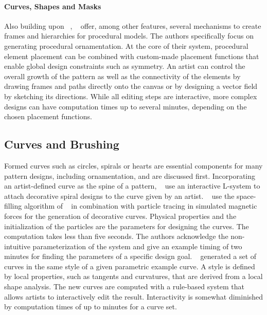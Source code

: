 {\paragraph*{Curves, Shapes and Masks} Also building upon \citeauthor*{wong_1998_cgf}~\cite{wong_1998_cgf}, \citeauthor*{gieseke_2017_ooo}~\cite{gieseke_2017_ooo} offer, among other features, several mechanisms to create frames and hierarchies for procedural models. The authors specifically focus on generating procedural ornamentation. At the core of their system, procedural element placement can be combined with custom-made placement functions that enable global design constraints such as symmetry. An artist can control the overall growth of the pattern as well as the connectivity of the elements by drawing frames and paths directly onto the canvas or by designing a vector field by sketching its directions. While all editing steps are interactive, more complex designs can have computation times up to several minutes, depending on the chosen placement functions.}


\subsection{Curves and Brushing}
\label{subsec:analysis_curves}


Formed curves such as circles, spirals or hearts are essential components for many pattern designs, including ornamentation, and are discussed first. Incorporating an artist-defined curve as the spine of a pattern, \citeauthor*{yu_2012_ans}~\cite{yu_2012_ans} use an interactive L-system to attach decorative spiral designs to the curve given by an artist. \citeauthor*{xu_2009_mcc}~\cite{xu_2009_mcc} use the space-filling algorithm of \citeauthor*{wong_1998_cgf}~\cite{wong_1998_cgf} in combination with particle tracing in simulated magnetic forces for the generation of decorative curves. Physical properties and the initialization of the particles are the parameters for designing the curves. The computation takes less than five seconds. The authors acknowledge the non-intuitive parameterization of the system and give an example timing of two minutes for finding the parameters of a specific design goal. \citeauthor*{merrell_2010_ecs}~\cite{merrell_2010_ecs} generated a set of curves in the same style of a given parametric example curve. A style is defined by local properties, such as tangents and curvatures, that are derived from a local shape analysis. The new curves are computed with a rule-based system that allows artists to interactively edit the result. Interactivity is somewhat diminished by computation times of up to minutes for a curve set. 

